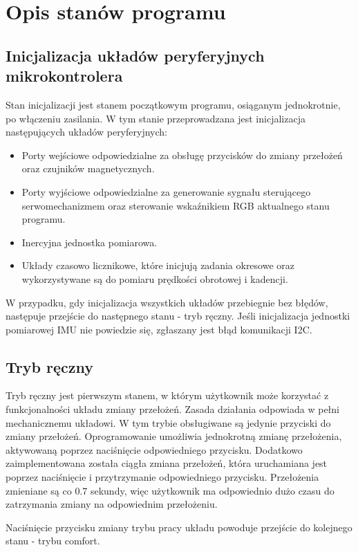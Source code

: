 \section{Opis stanów programu}
\subsection{Inicjalizacja układów peryferyjnych mikrokontrolera}
Stan inicjalizacji jest stanem początkowym programu, osiąganym jednokrotnie, po włączeniu zasilania. W tym stanie przeprowadzana jest inicjalizacja następujących układów peryferyjnych:
\begin{itemize}
\item
Porty wejściowe odpowiedzialne za obsługę przycisków do zmiany przełożeń oraz czujników magnetycznych.
\item
Porty wyjściowe odpowiedzialne za generowanie sygnału sterującego serwomechanizmem oraz sterowanie wskaźnikiem RGB aktualnego stanu programu. 
\item
Inercyjna jednostka pomiarowa.
\item
Układy czasowo licznikowe, które inicjują zadania okresowe oraz wykorzystywane są do pomiaru prędkości obrotowej i kadencji.
\end{itemize}

W przypadku, gdy inicjalizacja wszystkich układów przebiegnie bez błędów, następuje przejście do następnego stanu - tryb ręczny. Jeśli inicjalizacja jednostki pomiarowej IMU nie powiedzie się, zgłaszany jest błąd komunikacji I2C. 
\subsection{Tryb ręczny}
Tryb ręczny jest pierwszym stanem, w którym użytkownik może korzystać z funkcjonalności układu zmiany przełożeń. Zasada działania odpowiada w pełni mechanicznemu układowi. W tym trybie obsługiwane są jedynie przyciski do zmiany przełożeń. Oprogramowanie umożliwia jednokrotną zmianę przełożenia, aktywowaną poprzez naciśnięcie odpowiedniego przycisku. Dodatkowo zaimplementowana została ciągła zmiana przełożeń, która uruchamiana jest poprzez naciśnięcie i przytrzymanie odpowiedniego przycisku. Przełożenia zmieniane są co 0.7 sekundy, więc użytkownik ma odpowiednio dużo czasu do zatrzymania zmiany na odpowiednim przełożeniu.

Naciśnięcie przycisku zmiany trybu pracy układu powoduje przejście do kolejnego stanu - trybu comfort.
